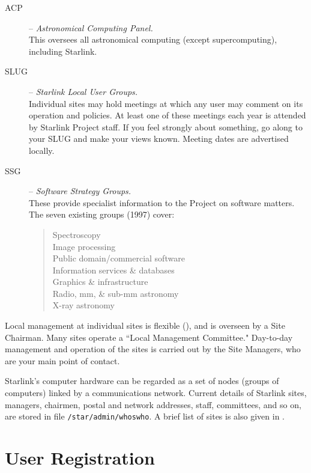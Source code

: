\begin{description}
\item [ACP] -- {\em Astronomical Computing Panel.}\\
This oversees all astronomical computing (except supercomputing),
including Starlink.
\item [SLUG] -- {\em Starlink Local User Groups.}\\
Individual sites may hold meetings at which any user may comment on its
operation and policies.
At least one of these meetings each year is attended by Starlink Project staff.
If you feel strongly about something, go along to your SLUG and make your
views known.
Meeting dates are advertised locally.
\item [SSG] -- {\em Software Strategy Groups.}\\
These provide specialist information to the Project on software matters.
The seven existing groups (1997) cover:
\begin{quote}
\begin{description}
\item [Spectroscopy]
\item [Image processing]
\item [Public domain/commercial software]
\item [Information services \& databases]
\item [Graphics \& infrastructure]
\item [Radio, mm, \& sub-mm astronomy]
\item [X-ray astronomy]
\end{description}
\end{quote}
\end{description}

Local management at individual sites is flexible
(),
and is overseen by a Site Chairman.
Many sites operate a ``Local Management Committee."
Day-to-day management and operation of the sites is carried out by the
Site Managers, who are your main point of contact.

Starlink's computer hardware can be regarded as a set of nodes (groups of
computers) linked by a communications network.
Current details of Starlink sites, managers, chairmen, postal and network
addresses, staff, committees, and so on, are stored in file
{\tt /star/\-admin/\-whoswho}.
A brief list of sites is also given in
.
\newpage

\section{User Registration}

